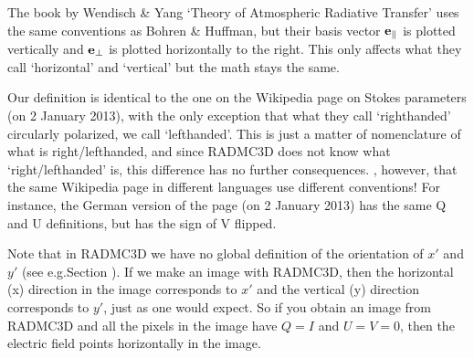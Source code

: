 \documentclass[letterpaper,10pt,english]{sphinxmanual}
\begin{document}
The book by Wendisch \& Yang ‘Theory of Atmospheric Radiative Transfer’ uses the
same conventions as Bohren \& Huffman, but their basis vector \({\bf
e}_{\parallel}\) is plotted vertically and \({\bf e}_{\perp}\) is plotted
horizontally to the right. This only affects what they call ‘horizontal’ and
‘vertical’ but the math stays the same.

Our definition is identical to the one on the  Wikipedia page on Stokes
parameters  (on 2 January 2013),
with the only exception that what they call ‘righthanded’ circularly polarized,
we call ‘lefthanded’. This is just a matter of nomenclature of what is
right/left\sphinxhyphen{}handed, and since RADMC\sphinxhyphen{}3D does not know what ‘right/lefthanded’ is,
this difference has no further consequences. , however, that the same
Wikipedia page in different languages use different conventions! For instance,
the German version of the page (on 2 January 2013) has the same Q and U
definitions, but has the sign of V flipped.

Note that in RADMC\sphinxhyphen{}3D we have no global definition of the orientation of
\(x'\) and \(y'\) (see e.g.Section
{\hyperref[\detokenize{dustradtrans:sec-orientation-vector-stokes}]{}}). If we make an image with RADMC\sphinxhyphen{}3D, then
the horizontal (x\sphinxhyphen{}) direction in the image corresponds to \(x'\) and the
vertical (y\sphinxhyphen{}) direction corresponds to \(y'\), just as one would expect. So
if you obtain an image from RADMC\sphinxhyphen{}3D and all the pixels in the image have
\(Q=I\) and \(U=V=0\), then the electric field points horizontally in
the image.
\end{document}
